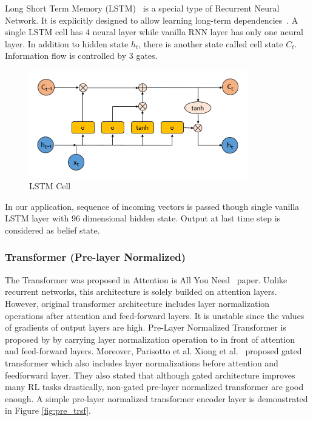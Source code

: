 \documentclass[a4paper, 12pt]{article} %
\begin{document}
Long Short Term Memory (LSTM)~\cite{hochreiter_long_1997} is a special type of Recurrent Neural Network. 
It is explicitly designed to allow learning long-term dependencies~\cite{olah_understanding_2015}. 
A single LSTM cell has 4 neural layer while vanilla RNN layer has only one neural layer. 
In addition to hidden state $h_t$, there is another state called cell state $C_t$. 
Information flow is controlled by 3 gates. 

\begin{figure}
	\centering
	\includegraphics[width=0.85\textwidth]{figures/ml_theory/lstm_cell.png}
	\caption{LSTM Cell}
	\label{fig:lstm_cell}
\end{figure}

In our application, sequence of incoming vectors is passed though single vanilla LSTM layer with 96 dimensional hidden state. 
Output at last time step is considered as belief state. 

\subsubsection{Transformer (Pre-layer Normalized)}

The Transformer was proposed in Attention is All You Need~ \cite{vaswani_attention_2017} paper. 
Unlike recurrent networks, this architecture is solely builded on attention layers. 
However, original transformer architecture includes layer normalization operations after attention and feed-forward layers. 
It is unstable since the values of gradients of output layers are high. Pre-Layer Normalized Transformer is proposed by \cite{xiong_layer_2020} by carrying layer normalization operation to in front of attention and feed-forward layers. 
Moreover, Parisotto et al. Xiong et al.~ \cite{parisotto_stabilizing_2019} proposed gated transformer which also includes layer normalizations before attention and feedforward layer. 
They also stated that although gated architecture improves many RL tasks drastically, non-gated pre-layer normalized transformer are good enough. 
A simple pre-layer normalized transformer encoder layer is demonstrated in Figure \ref{fig:pre_trsf}.
\end{document}
